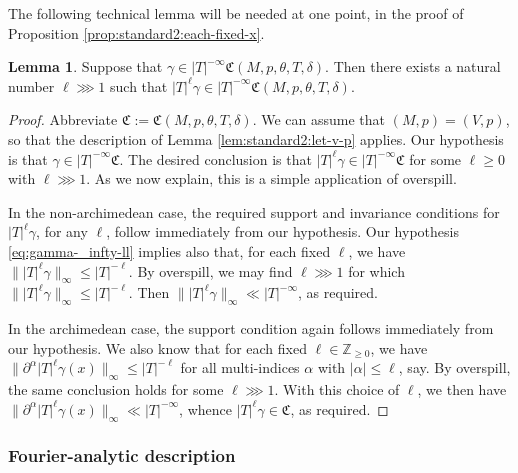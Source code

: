 \documentclass[reqno]{amsart}
\theoremstyle{plain} \newtheorem{theorem} {Theorem}
\theoremstyle{definition} \newtheorem{definition} [theorem] {Definition}
\theoremstyle{itplain} %
\newtheorem{lemma}[theorem]{Lemma}
\numberwithin{equation}{section}
\numberwithin{theorem}{section}
\renewcommand{\geq}{\geqslant}
\renewcommand{\leq}{\leqslant}
\begin{document}
The following technical lemma will be needed at one point, in the proof of Proposition \ref{prop:standard2:each-fixed-x}.
\begin{lemma}\label{lem:standard2:overspill-frak-C-M}
  Suppose that $\gamma \in |T|^{-\infty} \mathfrak{C}(M,p,\theta,T,\delta)$.  Then there exists a natural number $\ell \ggg 1$ such that $|T|^{\ell} \gamma \in |T|^{-\infty} \mathfrak{C}(M,p,\theta,T,\delta)$.
\end{lemma}
\begin{proof}
  Abbreviate $\mathfrak{C} := \mathfrak{C}(M,p,\theta,T,\delta)$.  We can assume that $(M,p) = (V,p)$, so that the description of Lemma \ref{lem:standard2:let-v-p} applies.  Our hypothesis is that $\gamma \in |T|^{-\infty} \mathfrak{C}$.  The desired conclusion is that $|T|^{\ell} \gamma \in |T|^{-\infty} \mathfrak{C}$ for some $\ell \geq 0$ with $\ell \ggg 1$.  As we now explain, this is a simple application of overspill.

  In the non-archimedean case, the required support and invariance conditions for $|T|^{\ell} \gamma$, for any $\ell$, follow immediately from our hypothesis.  Our hypothesis \eqref{eq:gamma-_infty-ll} implies also that, for each fixed $\ell$, we have $\||T|^{\ell} \gamma \|_{\infty} \leq |T|^{-\ell}$.  By overspill, we may  find $\ell \ggg 1$ for which $\||T|^{\ell} \gamma \|_{\infty} \leq |T|^{-\ell}$.  Then $\||T|^{\ell} \gamma \|_{\infty} \ll |T|^{-\infty}$, as required.

  In the archimedean case, the support condition again follows immediately from our hypothesis.  We also know that for each fixed $\ell \in \mathbb{Z}_{\geq 0}$, we have $\|\partial^\alpha |T|^{\ell} \gamma(x)\|_{\infty} \leq |T|^{-\ell}$ for all multi-indices $\alpha$ with $|\alpha| \leq \ell$, say.  By overspill, the same conclusion holds for some $\ell \ggg 1$.  With this choice of $\ell$, we then have $\|\partial^\alpha |T|^{\ell} \gamma (x)\|_{\infty} \ll |T|^{-\infty}$, whence $|T|^{\ell} \gamma \in \mathfrak{C}$, as required.
\end{proof}



\subsubsection{Fourier-analytic description}
\end{document}

